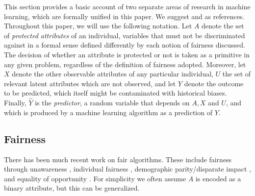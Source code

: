 

This section provides a basic account of two separate areas of
research in machine learning, which are formally unified in this
paper. We suggest \citet{berk:17} and \citet{pearl:16} as references.
Throughout this paper, we will use the following notation.  Let $A$
denote the set of {\it protected attributes} of an individual,
variables that must not be discriminated against in a formal sense
defined differently by each notion of fairness discussed. The decision
of whether an attribute is protected or not is taken as a primitive in
any given problem, regardless of the definition of fairness
adopted. Moreover, let $X$ denote the other observable attributes of
any particular individual, $U$ the set of relevant latent attributes
which are not observed, and let $Y$ denote the outcome to be
predicted, which itself might be contaminated with historical
biases. Finally, $\hat Y$ is the {\it predictor}, a random variable
that depends on $A, X$ and $U$, and which is produced by a machine
learning algorithm as a prediction of $Y$.

\subsection{Fairness}

There has been much recent work on fair algorithms.  These include
fairness through unawareness \cite{grgiccase}, individual fairness
\cite{dwork2012fairness,zemel2013learning,louizos2015variational,
  joseph2016rawlsian}, demographic parity/disparate impact
\cite{zafar2015learning}, and equality of opportunity
\cite{hardt2016equality,zafar2016fairness}.  For simplicity we often
assume $A$ is encoded as a binary attribute, but this can be
generalized.


